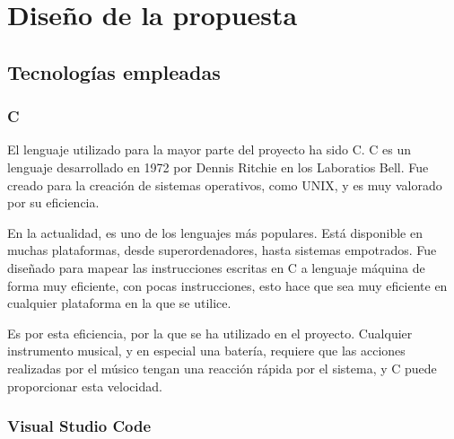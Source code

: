 
\chapter{Diseño de la propuesta} %
\label{cha:Diseno}


    \section{Tecnologías empleadas} %
    \label{sec:TecnologiasEmpleadas}

        \subsection{C} %
        \label{sub:CLanguage}

            El lenguaje utilizado para la mayor parte del proyecto ha sido C. C es un lenguaje desarrollado en 1972 por
            Dennis Ritchie en los Laboratios Bell. Fue creado para la creación de sistemas operativos, como UNIX, y es
            muy valorado por su eficiencia.

            En la actualidad, es uno de los lenguajes más populares. Está disponible en muchas plataformas, desde
            superordenadores, hasta sistemas empotrados. Fue diseñado para mapear las instrucciones escritas en C a
            lenguaje máquina de forma muy eficiente, con pocas instrucciones, esto hace que sea muy eficiente en
            cualquier plataforma en la que se utilice.\cite{wikipedia_c_language}

            Es por esta eficiencia, por la que se ha utilizado en el proyecto. Cualquier instrumento musical, y en
            especial una batería, requiere que las acciones realizadas por el músico tengan una reacción rápida por el
            sistema, y C puede proporcionar esta velocidad.


        \subsection{Visual Studio Code} %
        \label{sub:VisualStudioCode}

